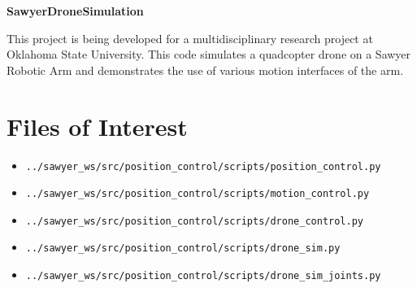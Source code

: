\documentclass[letterpaper,11pt]{article}
\begin{document}
\noindent

\begin{center}
\huge \textbf{SawyerDroneSimulation} \\
\end{center}

\normalsize This project is  being developed for a multidisciplinary research project at Oklahoma State University. This code simulates a quadcopter drone on a Sawyer Robotic Arm and demonstrates the use of various motion interfaces of the arm. 

\tableofcontents

\section{Files of Interest}
\begin{itemize}
	\item \begin{verbatim}../sawyer_ws/src/position_control/scripts/position_control.py\end{verbatim}
	\item \begin{verbatim}../sawyer_ws/src/position_control/scripts/motion_control.py\end{verbatim}
	\item \begin{verbatim}../sawyer_ws/src/position_control/scripts/drone_control.py\end{verbatim}
	\item \begin{verbatim}../sawyer_ws/src/position_control/scripts/drone_sim.py\end{verbatim}
	\item \begin{verbatim}../sawyer_ws/src/position_control/scripts/drone_sim_joints.py\end{verbatim}
\end{itemize}

	
\end{document}
